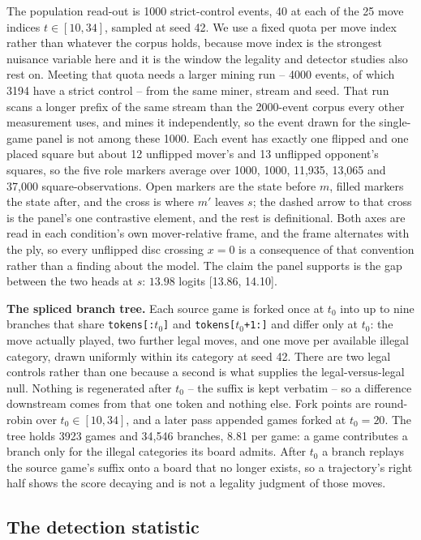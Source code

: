\documentclass{article}
\begin{document}
The population read-out is 1000 strict-control events, 40 at each of the 25 move indices $t \in
[10, 34]$, sampled at seed 42. We use a fixed quota per move index rather than whatever the
corpus holds, because move index is the strongest nuisance variable here and it is the window the
legality and detector studies also rest on. Meeting that quota needs a larger mining run -- 4000
events, of which 3194 have a strict control -- from the same miner, stream and seed. That run scans a longer prefix of
the same stream than the 2000-event corpus every other measurement uses, and mines it
independently, so the event drawn for the single-game panel is not among these 1000. Each event has exactly one
flipped and one placed square but about 12 unflipped mover's and 13 unflipped opponent's squares,
so the five role markers average over 1000, 1000, 11,935, 13,065 and 37,000 square-observations.
Open markers are the state before $m$, filled markers the state after, and the cross is where
$m'$ leaves $s$; the dashed arrow to that cross is the panel's one contrastive element, and the
rest is definitional. Both axes are read in each condition's own mover-relative frame, and the
frame alternates with the ply, so every unflipped disc crossing $x = 0$ is a consequence of that
convention rather than a finding about the model. The claim the panel supports is the gap between
the two heads at $s$: $13.98$ logits [13.86, 14.10].

\textbf{The spliced branch tree.} Each source game is forked once at $t_0$ into up to nine branches
that share \texttt{tokens[:$t_0$]} and \texttt{tokens[$t_0$+1:]} and differ only at $t_0$: the
move actually played, two further legal moves, and one move per available illegal category, drawn
uniformly within its category at seed 42. There are two legal controls rather than one because a
second is what supplies the legal-versus-legal null. Nothing is regenerated after $t_0$ -- the
suffix is kept verbatim -- so a difference downstream comes from that one token and nothing
else. Fork points are round-robin over $t_0 \in [10, 34]$, and a later pass appended
games forked at $t_0 = 20$. The tree holds 3923 games and 34,546 branches, 8.81 per game: a game contributes a branch
only for the illegal categories its board admits. After $t_0$ a branch
replays the source game's suffix onto a board that no longer exists, so a trajectory's right half
shows the score decaying and is not a legality judgment of those moves.

\subsection{The detection statistic}
\end{document}
